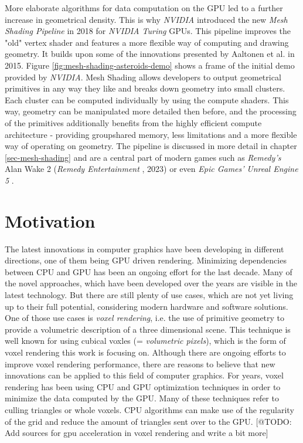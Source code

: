 \noindent
More elaborate algorithms for data computation on the \ac{GPU} led to a further increase in geometrical density.
This is why \emph{NVIDIA} introduced the new \emph{Mesh Shading Pipeline} in 2018 for \emph{NVIDIA Turing} \ac{GPU}s.
This pipeline improves the "old" vertex shader and features a more flexible way of computing and drawing geometry. 
It builds upon some of the innovations presented by Aaltonen et al.  \cite{Aaltonen2015} in 2015. Figure 
\ref{fig:mesh-shading-asteroids-demo} shows a frame of the initial demo provided by \emph{NVIDIA}. Mesh Shading 
allows developers to output geometrical primitives in any way they like and breaks down geometry into small clusters.
Each cluster can be computed individually by using the compute shaders. This way, geometry can be manipulated more 
detailed then before, and the processing of the primitives additionally benefits from the highly efficient compute 
architecture - providing groupshared memory, less limitations and a more flexible way of operating on geometry.
The pipeline is discussed in more detail in chapter \ref{sec-mesh-shading} and are a central part of modern games 
such as \emph{Remedy's} Alan Wake 2 (\emph{Remedy Entertainment} \cite{AlanWake22023}, 2023) or even 
\emph{Epic Games'} \emph{Unreal Engine 5} \cite{Karis2021}. 


\section{Motivation} \label{sec-motivation}

The latest innovations in computer graphics have been developing in different directions,
one of them being \ac{GPU} driven rendering. Minimizing dependencies between \ac{CPU} and \ac{GPU} 
has been an ongoing effort for the last decade. Many of the novel approaches, which have been developed 
over the years are visible in the latest technology. But there are still plenty of use cases, which are 
not yet living up to their full potential, considering modern hardware and software solutions.\\

\noindent 
One of those use cases is \emph{voxel rendering}, i.e. the use of primitive geometry to provide a 
volumetric description of a three dimensional scene. This technique is well known for using 
cubical voxles (= \emph{volumetric pixels}), which is the form of voxel rendering this work is 
focusing on. Although there are ongoing efforts to improve voxel rendering performance, there are 
reasons to believe that new innovations can be applied to this field of computer graphics. For years, 
voxel rendering has been using \ac{CPU} and \ac{GPU} optimization techniques in order to minimize 
the data computed by the \ac{GPU}. Many of these techniques refer to culling triangles or whole voxels. 
\ac{CPU} algorithms can make use of the regularity of the grid and reduce the amount of triangles sent 
over to the \ac{GPU}. [@TODO: Add sources for gpu acceleration in voxel rendering and write a bit more] \\

